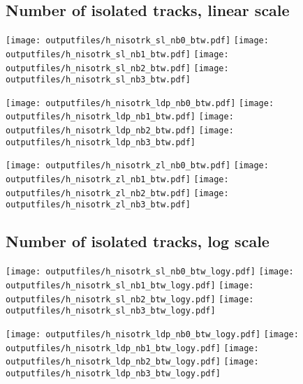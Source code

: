 \documentclass[11pt]{article}
\begin{document}
    \subsection{ Number of isolated tracks, linear scale}

    \noindent
     \texttt{[image: outputfiles/h\_nisotrk\_sl\_nb0\_btw.pdf]}
     \texttt{[image: outputfiles/h\_nisotrk\_sl\_nb1\_btw.pdf]}
     \texttt{[image: outputfiles/h\_nisotrk\_sl\_nb2\_btw.pdf]}
     \texttt{[image: outputfiles/h\_nisotrk\_sl\_nb3\_btw.pdf]}

    \noindent
     \texttt{[image: outputfiles/h\_nisotrk\_ldp\_nb0\_btw.pdf]}
     \texttt{[image: outputfiles/h\_nisotrk\_ldp\_nb1\_btw.pdf]}
     \texttt{[image: outputfiles/h\_nisotrk\_ldp\_nb2\_btw.pdf]}
     \texttt{[image: outputfiles/h\_nisotrk\_ldp\_nb3\_btw.pdf]}

    \noindent
     \texttt{[image: outputfiles/h\_nisotrk\_zl\_nb0\_btw.pdf]}
     \texttt{[image: outputfiles/h\_nisotrk\_zl\_nb1\_btw.pdf]}
     \texttt{[image: outputfiles/h\_nisotrk\_zl\_nb2\_btw.pdf]}
     \texttt{[image: outputfiles/h\_nisotrk\_zl\_nb3\_btw.pdf]}

    \clearpage


    \subsection{ Number of isolated tracks, log scale}

    \noindent
     \texttt{[image: outputfiles/h\_nisotrk\_sl\_nb0\_btw\_logy.pdf]}
     \texttt{[image: outputfiles/h\_nisotrk\_sl\_nb1\_btw\_logy.pdf]}
     \texttt{[image: outputfiles/h\_nisotrk\_sl\_nb2\_btw\_logy.pdf]}
     \texttt{[image: outputfiles/h\_nisotrk\_sl\_nb3\_btw\_logy.pdf]}

    \noindent
     \texttt{[image: outputfiles/h\_nisotrk\_ldp\_nb0\_btw\_logy.pdf]}
     \texttt{[image: outputfiles/h\_nisotrk\_ldp\_nb1\_btw\_logy.pdf]}
     \texttt{[image: outputfiles/h\_nisotrk\_ldp\_nb2\_btw\_logy.pdf]}
     \texttt{[image: outputfiles/h\_nisotrk\_ldp\_nb3\_btw\_logy.pdf]}
\end{document}
